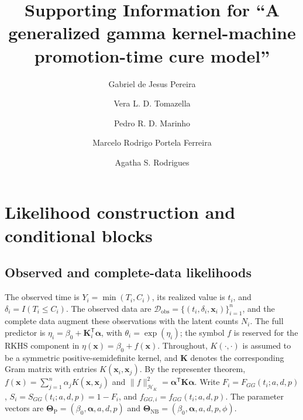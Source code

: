 \documentclass[11pt]{article}
\title{Supporting Information for ``A generalized gamma kernel-machine promotion-time cure model''}
\author{Gabriel de Jesus Pereira \and Vera L. D. Tomazella \and Pedro R. D. Marinho \and Marcelo Rodrigo Portela Ferreira \and Agatha S. Rodrigues}
\date{}
\begin{document}
\maketitle

\section{Likelihood construction and conditional blocks}\label{sec:supp-likelihood}

\subsection{Observed and complete-data likelihoods}

The observed time is $Y_i=\min(T_i,C_i)$, its realized value
is $t_i$, and $\delta_i=I(T_i\leq C_i)$. The observed data
are $\mathcal D_{\mathrm{obs}}=\{(t_i,\delta_i,\bm{x}_i)\}_{i=1}^{n}$,
and the complete data augment these observations with the
latent counts $N_i$. The full predictor is $\eta_i=\beta_0+\bm K_i^{\mathsf T}\bm\alpha$,
with $\theta_i=\exp(\eta_i)$; the symbol $f$ is reserved for
the RKHS component in $\eta(\bm{x})=\beta_0+f(\bm{x})$.
Throughout, $K(\cdot,\cdot)$ is assumed to be a symmetric
positive-semidefinite kernel, and $\bm K$ denotes the corresponding
Gram matrix with entries $K(\bm x_i,\bm x_j)$. By the representer
theorem, $f(\bm x)=\sum_{j=1}^{n}\alpha_jK(\bm x,\bm x_j)$ and
$\|f\|_{\mathcal H_K}^2=\bm\alpha^{\mathsf T}\bm K\bm\alpha$.
Write $F_i=F_{GG}(t_i;a,d,p)$, $S_i=S_{GG}(t_i;a,d,p)=1-F_i$,
and $f_{GG,i}=f_{GG}(t_i;a,d,p)$. The parameter vectors are
$\bm\Theta_{\mathrm P}=(\beta_0,\bm\alpha,a,d,p)$ and
$\bm\Theta_{\mathrm{NB}}=(\beta_0,\bm\alpha,a,d,p,\phi)$.
\end{document}

